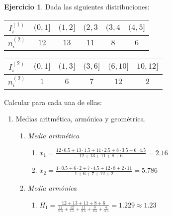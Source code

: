 \documentclass[a4paper, 12pt]{article}
\theoremstyle{definition}
\newtheorem{ej}{Ejercicio}
\begin{document}
\begin{ej}
Dada las siguientes distribuciones:

\begin{center}

\begin{tabular}{|c|c|c|c|c|c|}
\hline
     \(I_i ^{(1)}\) & \((0,1]\) & \((1,2]\) & \((2,3\) & \((3,4\) & \((4,5]\)  \\
     \hline
     \(n_i^{(2)}\) & \(12\) & \(13\) & \(11\) & \(8\) & \(6\) \\
     \hline
\end{tabular}

\vspace{0.3cm}

\begin{tabular}{|c|c|c|c|c|c|}
\hline
     \(I_i^{(2)}\) & \((0,1]\) & \((1,3]\) & \((3,6]\) & \((6,10]\) & \(10,12]\) \\
     \hline
     \(n_i^{(2)}\) & \(1\) & \(6\) & \(7\) & \(12\) & \(2\) \\
     \hline
\end{tabular}

\end{center}

\newpage

Calcular para cada una de ellas:

\begin{enumerate}[label=\textit{\alph*)}]
    \item Medias aritmética, armónica y geométrica.
    \begin{enumerate}[label=]
        \item \textit{Media aritmética}
        \begin{enumerate}[label=\arabic*.]
        \centering
            \item \(\overline{x}_1 = \frac{12\cdot0.5 + 13\cdot 1.5 + 11 \cdot 2.5 + 8 \cdot 3.5 + 6 \cdot 4.5}{12+13+11+8+6} = 2.16\)
            
            \item \(\overline{x}_2 = \frac{1 \cdot 0.5 + 6 \cdot 2 + 7 \cdot 4.5 + 12 \cdot 8 + 2 \cdot 11}{1+6+7+12+2} = 5.786\)
        \end{enumerate}
        
        \item \textit{Media armónica}
        \begin{enumerate}[label=\arabic*.]
            \item \(H_1 = \frac{12+13+11+8+6}{\frac{12}{0.5} + \frac{12}{1.5} + \frac{11}{2.5} + \frac{8}{3.5} + \frac{6}{4.5}} = 1.229 \approx 1.23\)
            

\end{enumerate}
\end{enumerate}
\end{enumerate}
\end{ej}
\end{document}
